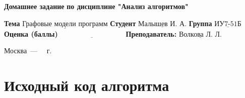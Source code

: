 \documentclass[12pt]{report}
\begin{document}
\begin{titlepage}
	
	\begin{center}
		\noindent\begin{minipage}{1.3\textwidth}\centering
			\Large\textbf{  Домашнее задание }\newline
			\textbf{по дисциплине "Анализ алгоритмов"}\newline\newline
		\end{minipage}
	\end{center}
	
	\noindent\textbf{Тема} $\underline{\text{Графовые модели программ}}$\newline\newline
	\noindent\textbf{Студент} $\underline{\text{Малышев И. А.}}$\newline\newline
	\noindent\textbf{Группа} $\underline{\text{ИУ7-51Б}}$\newline\newline
	\noindent\textbf{Оценка (баллы)} $\underline{\text{~~~~~~~~~~~~~~~~~~~~~~~~~~~}}$\newline\newline
	\noindent\textbf{Преподаватель: } $\underline{\text{Волкова Л. Л.}}$\newline\newline\newline
	
	\begin{center}
		\vfill
		Москва~---~\the\year
		~г.
	\end{center}
\end{titlepage}


\tableofcontents
  
\chapter{Исходный код алгоритма}
\end{document}
